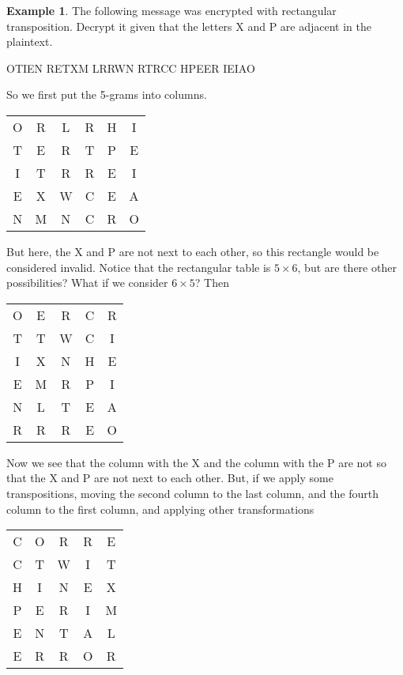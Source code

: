 \documentclass[11pt]{amsart}
\theoremstyle{definition}\newtheorem{definition}{Definition}
\theoremstyle{definition}\newtheorem{example}{Example}
\theoremstyle{definition}\newtheorem{samplecode}{Sample Code}
\begin{document}
\begin{example}
    The following message was encrypted with rectangular transposition. Decrypt it given that the letters X and P are adjacent in the plaintext.
    \begin{center}
        OTIEN RETXM LRRWN RTRCC HPEER IEIAO
    \end{center}
\end{example}

So we first put the 5-grams into columns.
\begin{center}
    \begin{tabular}{cccccc}
        O & R & L & R & H & I \\
        T & E & R & T & P & E \\
        I & T & R & R & E & I \\
        E & X & W & C & E & A \\
        N & M & N & C & R & O
    \end{tabular}
\end{center}
But here, the X and P are not next to each other, so this rectangle would be considered invalid. Notice that the rectangular table is $5 \times 6$, but are there other possibilities? What if we consider $6 \times 5$? Then
\begin{center}
    \begin{tabular}{ccccc}
        O & E & R & C & R\\
        T & T & W & C & I\\
        I & X & N & H & E\\
        E & M & R & P & I\\
        N & L & T & E & A\\
        R & R & R & E & O\\
    \end{tabular}
\end{center}
Now we see that the column with the X and the column with the P are not so that the X and P are not next to each other. But, if we apply some transpositions, moving the second column to the last column, and the fourth column to the first column, and applying other transformations
\begin{center}
    \begin{tabular}{ccccc}
        C & O & R & R & E\\
        C & T & W & I & T\\
        H & I & N & E & X\\
        P & E & R & I & M\\
        E & N & T & A & L\\
        E & R & R & O & R\\
    \end{tabular}
\end{center}
\end{document}
